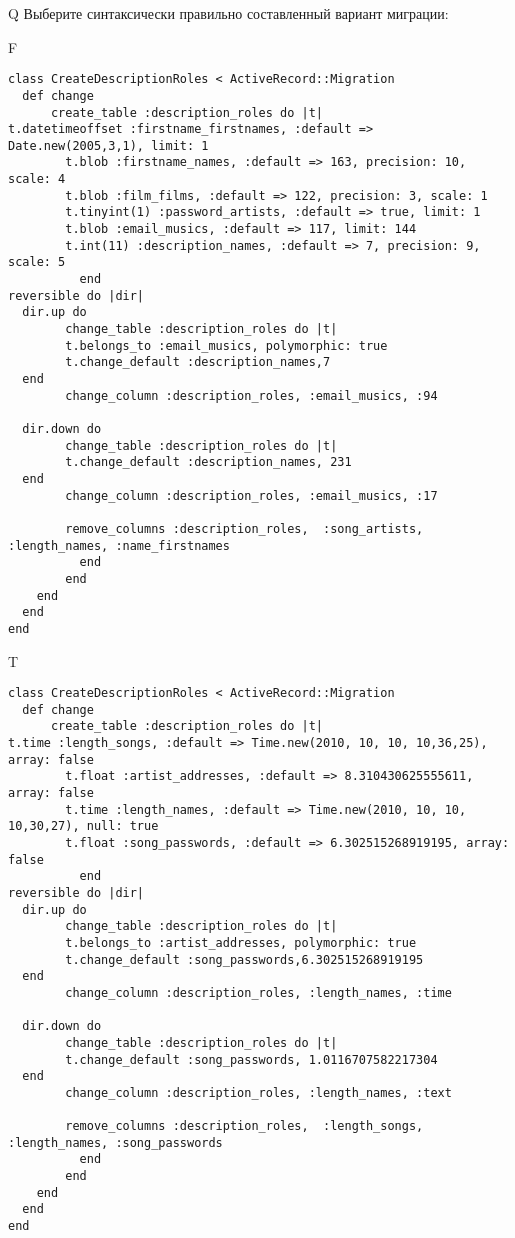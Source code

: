 Q
Выберите синтаксически правильно составленный вариант миграции:

F
\begin{verbatim}
class CreateDescriptionRoles < ActiveRecord::Migration
  def change
	  create_table :description_roles do |t|
t.datetimeoffset :firstname_firstnames, :default => Date.new(2005,3,1), limit: 1
		t.blob :firstname_names, :default => 163, precision: 10, scale: 4
		t.blob :film_films, :default => 122, precision: 3, scale: 1
		t.tinyint(1) :password_artists, :default => true, limit: 1
		t.blob :email_musics, :default => 117, limit: 144
		t.int(11) :description_names, :default => 7, precision: 9, scale: 5
		  end
reversible do |dir|
  dir.up do
		change_table :description_roles do |t|
		t.belongs_to :email_musics, polymorphic: true
 		t.change_default :description_names,7
  end
 		change_column :description_roles, :email_musics, :94
   
  dir.down do
		change_table :description_roles do |t|
		t.change_default :description_names, 231
  end
 		change_column :description_roles, :email_musics, :17
   
		remove_columns :description_roles,  :song_artists, :length_names, :name_firstnames 
	      end
	    end
    end 
  end
end

\end{verbatim}

T
\begin{verbatim}
class CreateDescriptionRoles < ActiveRecord::Migration
  def change
	  create_table :description_roles do |t|
t.time :length_songs, :default => Time.new(2010, 10, 10, 10,36,25), array: false
		t.float :artist_addresses, :default => 8.310430625555611, array: false
		t.time :length_names, :default => Time.new(2010, 10, 10, 10,30,27), null: true
		t.float :song_passwords, :default => 6.302515268919195, array: false
		  end
reversible do |dir|
  dir.up do
		change_table :description_roles do |t|
		t.belongs_to :artist_addresses, polymorphic: true
 		t.change_default :song_passwords,6.302515268919195
  end
 		change_column :description_roles, :length_names, :time
   
  dir.down do
		change_table :description_roles do |t|
		t.change_default :song_passwords, 1.0116707582217304
  end
 		change_column :description_roles, :length_names, :text
   
		remove_columns :description_roles,  :length_songs, :length_names, :song_passwords 
	      end
	    end
    end 
  end
end

\end{verbatim}

